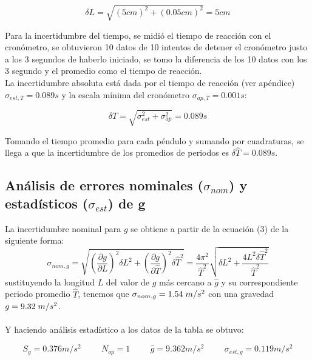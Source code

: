 \documentclass[DIV=calc, paper=a4, fontsize=11pt]{scrartcl}
\begin{document}
\begin{equation*}
    \delta L = \sqrt{(5cm)^2 + (0.05cm)^2} = 5cm
\end{equation*}

Para la incertidumbre del tiempo, se midió el tiempo de reacción con el cronómetro, se obtuvieron 10 datos de 10 intentos de detener el cronómetro justo a los 3 segundos de haberlo iniciado, se tomo la diferencia de los 10 datos con los 3 segundo y  el promedio como el tiempo de reacción.\\
La incertidumbre absoluta está dada por el tiempo de reacción (ver apéndice) $\sigma_{est, T} = 0.089 s$ y la escala mínima del cronómetro $\sigma_{ap, T} = 0.001s$:

\begin{equation*}
    \delta T = \sqrt{\sigma_{est}^2 + \sigma_{ap}^2} = 0.089 s
\end{equation*}

Tomando el tiempo promedio para cada péndulo y sumando por cuadraturas, se llega a que la incertidumbre de los promedios de periodos es $\delta \hat{T} = 0.089 s$.


\subsection*{ \textcolor{carmine} {Análisis de errores nominales ($\sigma_{nom}$) y estadísticos ($\sigma_{est}$) de g}}
La incertidumbre nominal para $g$ se obtiene  a partir de la ecuación (3) de la siguiente forma:
\begin{equation*}
    \sigma_{nom, g} = \sqrt{\left(\frac{\partial g}{\partial L}\right)^2 \delta L^2 + \left(\frac{\partial g}{\partial \hat{T}}\right)^2\delta \hat{T}^2} = \frac{4\pi^2}{\hat{T}^2} \sqrt{\delta L^2 + \frac{4L^2\delta \hat{T}^2}{\hat{T}^2}} 
\end{equation*}
\noindent sustituyendo la longitud $L$ del valor de $g$ más cercano a $\hat{g}$ y su correspondiente periodo promedio $\hat{T}$, tenemos que $\sigma_{nom, g}= 1.54\hspace{0.1cm}  m/s^2 $ con una gravedad $g = 9.32\hspace{0.1cm} m/s^2$.
\\\\
Y haciendo análisis estadístico a los datos de la tabla se obtuvo:


\begin{equation*}
    S_g = 0.376 m/s^2 \hspace{1cm} N_{op} = 1 \hspace{1cm} \hat{g} = 9.362m/s^2 \hspace{1cm} \sigma_{est, g} = 0.119m/s^2
\end{equation*}
\end{document}

